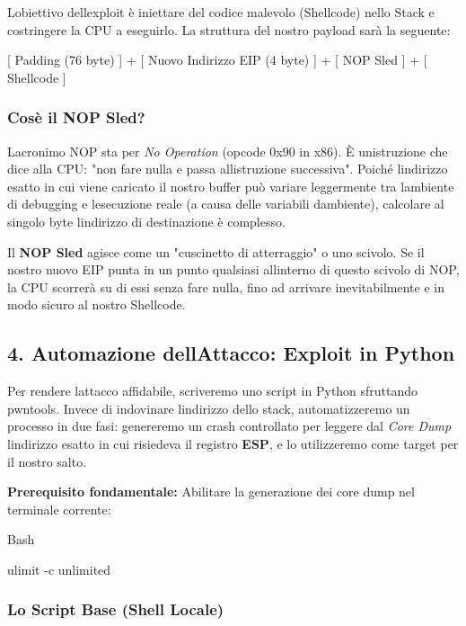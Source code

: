 \documentclass[11pt,a4paper]{article}
\begin{document}
L\textquotesingle obiettivo dell\textquotesingle exploit è iniettare del
codice malevolo (Shellcode) nello Stack e costringere la CPU a
eseguirlo. La struttura del nostro payload sarà la seguente:

{[} Padding (76 byte) {]} + {[} Nuovo Indirizzo EIP (4 byte) {]} + {[}
NOP Sled {]} + {[} Shellcode {]}

\subsubsection{Cos\textquotesingle è il NOP
Sled?}\label{cosuxe8-il-nop-sled}

L\textquotesingle acronimo NOP sta per \emph{No Operation} (opcode 0x90
in x86). È un\textquotesingle istruzione che dice alla CPU: "non fare
nulla e passa all\textquotesingle istruzione successiva". Poiché
l\textquotesingle indirizzo esatto in cui viene caricato il nostro
buffer può variare leggermente tra l\textquotesingle ambiente di
debugging e l\textquotesingle esecuzione reale (a causa delle variabili
d\textquotesingle ambiente), calcolare al singolo byte
l\textquotesingle indirizzo di destinazione è complesso.

Il \textbf{NOP Sled} agisce come un "cuscinetto di atterraggio" o uno
scivolo. Se il nostro nuovo EIP punta in un punto qualsiasi
all\textquotesingle interno di questo scivolo di NOP, la CPU scorrerà su
di essi senza fare nulla, fino ad arrivare inevitabilmente e in modo
sicuro al nostro Shellcode.

\subsection{4. Automazione dell\textquotesingle Attacco: Exploit in
Python}\label{automazione-dellattacco-exploit-in-python}

Per rendere l\textquotesingle attacco affidabile, scriveremo uno script
in Python sfruttando pwntools. Invece di indovinare
l\textquotesingle indirizzo dello stack, automatizzeremo un processo in
due fasi: genereremo un crash controllato per leggere dal \emph{Core
Dump} l\textquotesingle indirizzo esatto in cui risiedeva il registro
\textbf{ESP}, e lo utilizzeremo come target per il nostro salto.

\textbf{Prerequisito fondamentale:} Abilitare la generazione dei core
dump nel terminale corrente:

Bash

ulimit -c unlimited

\subsubsection{Lo Script Base (Shell
Locale)}\label{lo-script-base-shell-locale}
\end{document}
